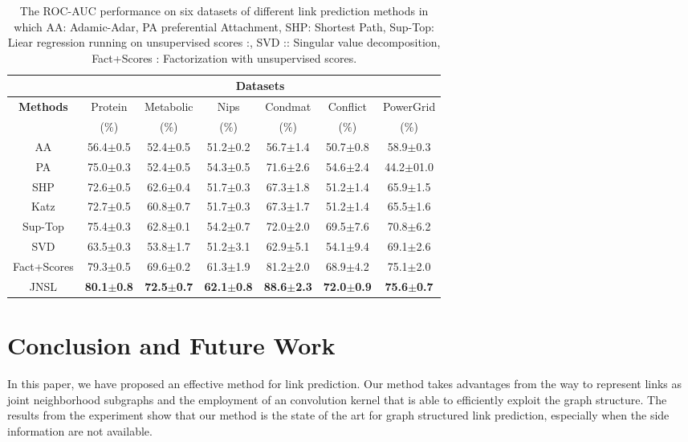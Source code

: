 \documentclass[runningheads,a4paper]{llncs}
\begin{document}
\begin{table}
\caption{The ROC-AUC performance on six datasets of different link prediction methods in which AA: Adamic-Adar, PA \cite{pa} preferential Attachment, SHP: Shortest Path, Sup-Top: Liear regression running on unsupervised scores \cite{matrix-factorization}:, SVD \cite{matrix-factorization}:: Singular value decomposition, Fact+Scores \cite{matrix-factorization}: Factorization with unsupervised scores. }
\centering
\setlength{\tabcolsep}{1mm}
\begin{tabular}{|c|c|c|c|c|c|c|}

\hline
         & \multicolumn{6}{c|}{\textbf{Datasets}}\\
 \hline
\textbf{Methods} & Protein & Metabolic & Nips & Condmat & Conflict & PowerGrid\\
	& ($\%$) & ($\%$) & ($\%$) & ($\%$) & ($\%$) & ($\%$)\\
\hline
AA & 56.4$\pm$0.5 & 52.4$\pm$0.5 & 51.2$\pm$0.2 & 56.7$\pm$1.4 & 50.7$\pm$0.8 & 58.9$\pm$0.3\\
PA & 75.0$\pm$0.3 & 52.4$\pm$0.5 & 54.3$\pm$0.5 & 71.6$\pm$2.6 & 54.6$\pm$2.4 & 44.2$\pm$01.0\\
SHP & 72.6$\pm$0.5 & 62.6$\pm$0.4 & 51.7$\pm$0.3 & 67.3$\pm$1.8 & 51.2$\pm$1.4 & 65.9$\pm$1.5\\
Katz & 72.7$\pm$0.5 & 60.8$\pm$0.7 & 51.7$\pm$0.3 & 67.3$\pm$1.7 & 51.2$\pm$1.4 & 65.5$\pm$1.6 \\
Sup-Top & 75.4$\pm$0.3 & 62.8$\pm$0.1 & 54.2$\pm$0.7 & 72.0$\pm$2.0 & 69.5$\pm$7.6 & 70.8$\pm$6.2\\
SVD & 63.5$\pm$0.3 & 53.8$\pm$1.7 & 51.2$\pm$3.1 & 62.9$\pm$5.1 & 54.1$\pm$9.4 & 69.1$\pm$2.6\\
Fact+Scores & 79.3$\pm$0.5 & 69.6$\pm$0.2 & 61.3$\pm$1.9 & 81.2$\pm$2.0 & 68.9$\pm$4.2 & 75.1$\pm$2.0 \\
JNSL & \textbf{80.1$\pm$0.8} & \textbf{72.5$\pm$0.7} & \textbf{62.1$\pm$0.8} & \textbf{88.6$\pm$2.3} & \textbf{72.0$\pm$0.9} & \textbf{75.6$\pm$0.7} \\
 \hline 
\end{tabular}
\label{result_table}
\end{table}
\section{Conclusion and Future Work}
In this paper, we have proposed an effective method for link prediction. Our method takes advantages from the way to represent links as joint neighborhood subgraphs and the employment of an convolution kernel that is able to efficiently exploit the graph structure. The results from the experiment show that our method is the state of the art for graph structured link prediction, especially when the side information are not available.
\end{document}
